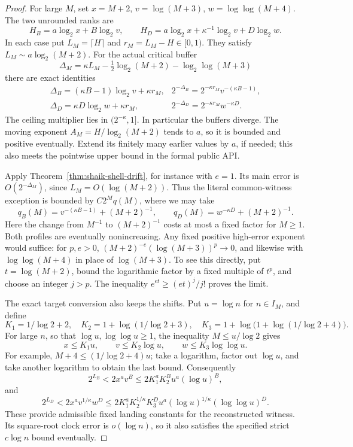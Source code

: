 \documentclass[11pt]{article}
\theoremstyle{remark}\newtheorem{remark}[proposition]{Remark}
\begin{document}
\begin{proof}
For large \(M\), set \(x=M+2\), \(v=\log(M+3)\),
\(w=\log\log(M+4)\). The two unrounded ranks are
\[
 H_B=a\log_2x+B\log_2v,\qquad
 H_D=a\log_2x+\kappa^{-1}\log_2v+D\log_2w.
\]
In each case put \(L_M=\lceil H\rceil\) and \(r_M=L_M-H\in[0,1)\).
They satisfy \(L_M\sim a\log_2(M+2)\). For the actual critical buffer
\[
 \Delta_M=\kappa L_M-\tfrac12\log_2(M+2)-\log_2\log(M+3)
\]
there are exact identities
\begin{equation}\label{eq:shaik-critical-cancellation}
 \begin{array}{ll}
 \Delta_B=(\kappa B-1)\log_2v+\kappa r_M,
 &2^{-\Delta_B}=2^{-\kappa r_M}v^{-(\kappa B-1)},\\[2pt]
 \Delta_D=\kappa D\log_2w+\kappa r_M,
 &2^{-\Delta_D}=2^{-\kappa r_M}w^{-\kappa D}.
 \end{array}
\end{equation}
The ceiling multiplier lies in \((2^{-\kappa},1]\).
In particular the buffers diverge. The moving exponent
\(A_M=H/\log_2(M+2)\) tends to \(a\), so it is bounded and positive
eventually. Extend its finitely many earlier values by \(a\), if needed;
this also meets the pointwise upper bound in the formal public API.

Apply Theorem~\ref{thm:shaik-shell-drift}, for instance with \(e=1\).
Its main error is \(O(2^{-\Delta_M})\), since \(L_M=O(\log(M+2))\).
Thus the literal common-witness exception is bounded by \(C2^Mq(M)\),
where we may take
\[
 q_B(M)=v^{-(\kappa B-1)}+(M+2)^{-1},\qquad
 q_D(M)=w^{-\kappa D}+(M+2)^{-1}.
\]
Here the change from \(M^{-1}\) to \((M+2)^{-1}\) costs at most a
fixed factor for \(M\ge1\). Both profiles are eventually nonincreasing.
Any fixed positive high-error exponent would suffice: for \(p,e>0\),
\((M+2)^{-e}(\log(M+3))^p\to0\), and likewise with
\(\log\log(M+4)\) in place of \(\log(M+3)\).
To see this directly, put \(t=\log(M+2)\), bound the logarithmic
factor by a fixed multiple of \(t^p\), and choose an integer \(j>p\).
The inequality \(e^{et}\ge (et)^j/j!\) proves the limit.

The exact target conversion also keeps the shifts. Put \(u=\log n\)
for \(n\in I_M\), and define
\[
 K_1=1/\log2+2,\quad K_2=1+\log(1/\log2+3),\quad
 K_3=1+\log\bigl(1+\log(1/\log2+4)\bigr).
\]
For large \(n\), so that \(\log u,\log\log u\ge1\), the inequality
\(M\le u/\log2\) gives
\[
 x\le K_1u,\qquad v\le K_2\log u,\qquad
 w\le K_3\log\log u.
\]
For example, \(M+4\le(1/\log2+4)u\); take a logarithm, factor out
\(\log u\), and take another logarithm to obtain the last bound.
Consequently
\[
 2^{L_B}<2x^av^B
 \le2K_1^aK_2^B u^a(\log u)^B,
\]
and
\[
 2^{L_D}<2x^av^{1/\kappa}w^D
 \le2K_1^aK_2^{1/\kappa}K_3^D
                   u^a(\log u)^{1/\kappa}(\log\log u)^D.
\]
These provide admissible fixed landing constants for the reconstructed
witness. Its square-root clock error is \(o(\log n)\), so it also
satisfies the specified strict \(c\log n\) bound eventually.


\end{proof}
\end{document}
